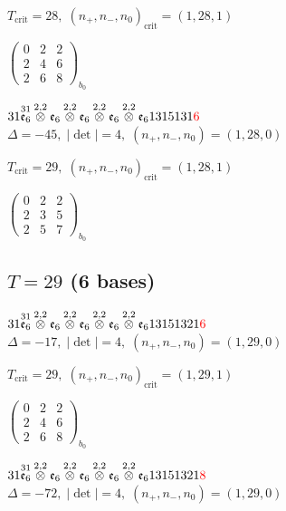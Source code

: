 \documentclass[10pt]{article}
\begin{document}
\hspace{1em}$T_{\text{crit}}=28,\; (n_+,n_-,n_0)_{\text{crit}}=(1,28,1)$

\hspace{2em}$\left(\begin{smallmatrix}0 & 2 & 2 \\ 2 & 4 & 6 \\ 2 & 6 & 8\end{smallmatrix}\right)_{\!b_0}$

$31\overset{31}{\mathfrak{e}_6}\overset{2,2}{\otimes}\mathfrak{e}_6\overset{2,2}{\otimes}\mathfrak{e}_6\overset{2,2}{\otimes}\mathfrak{e}_6\overset{2,2}{\otimes}\mathfrak{e}_61315131\textcolor{red}{6}$ \quad $\Delta=-45,\; |\det|=4,\; (n_+,n_-,n_0)=(1,28,0)$

\hspace{1em}$T_{\text{crit}}=29,\; (n_+,n_-,n_0)_{\text{crit}}=(1,28,1)$

\hspace{2em}$\left(\begin{smallmatrix}0 & 2 & 2 \\ 2 & 3 & 5 \\ 2 & 5 & 7\end{smallmatrix}\right)_{\!b_0}$


\subsection*{$T = 29$ \quad (6 bases)}
\smallskip

$31\overset{31}{\mathfrak{e}_6}\overset{2,2}{\otimes}\mathfrak{e}_6\overset{2,2}{\otimes}\mathfrak{e}_6\overset{2,2}{\otimes}\mathfrak{e}_6\overset{2,2}{\otimes}\mathfrak{e}_613151321\textcolor{red}{6}$ \quad $\Delta=-17,\; |\det|=4,\; (n_+,n_-,n_0)=(1,29,0)$

\hspace{1em}$T_{\text{crit}}=29,\; (n_+,n_-,n_0)_{\text{crit}}=(1,29,1)$

\hspace{2em}$\left(\begin{smallmatrix}0 & 2 & 2 \\ 2 & 4 & 6 \\ 2 & 6 & 8\end{smallmatrix}\right)_{\!b_0}$

$31\overset{31}{\mathfrak{e}_6}\overset{2,2}{\otimes}\mathfrak{e}_6\overset{2,2}{\otimes}\mathfrak{e}_6\overset{2,2}{\otimes}\mathfrak{e}_6\overset{2,2}{\otimes}\mathfrak{e}_613151321\textcolor{red}{8}$ \quad $\Delta=-72,\; |\det|=4,\; (n_+,n_-,n_0)=(1,29,0)$
\end{document}
